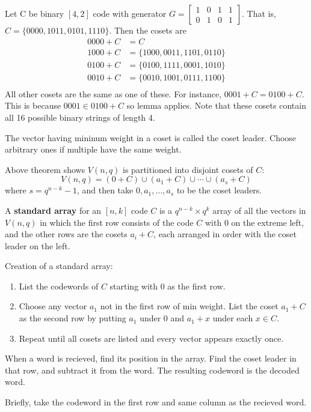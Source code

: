 \documentclass{article}
\begin{document}
\begin{example}
  Let C be binary \( [4, 2] \) code with generator \( G = \begin{bmatrix}
    1 & 0 & 1 & 1 \\
    0 & 1 & 0 & 1
  \end{bmatrix} \). That is, \( C = \{0000, 1011, 0101, 1110\} \). Then the cosets are \begin{align*}
    0000 + C & = C                          \\
    1000 + C & = \{1000, 0011, 1101, 0110\} \\
    0100 + C & = \{0100, 1111, 0001, 1010\} \\
    0010 + C & = \{0010, 1001, 0111, 1100\} \\
  \end{align*}
  All other cosets are the same as one of these. For instance, \( 0001 + C = 0100 + C \). This is because \( 0001 \in 0100 + C \) so lemma applies. Note that these cosets contain all 16 possible binary strings of length 4.
\end{example}
\begin{definition}
  The vector having mininum weight in a coset is called the coset leader. Choose arbitrary ones if multiple have the same weight.

  Above theorem shows \( V(n, q) \) is partitioned into disjoint cosets of \( C \): \[
    V(n, q) = (0 + C) \cup (a_1 + C) \cup \cdots \cup (a_s + C)
  \]
  where \( s = q^{n-k} -1 \), and then take \( 0, a_1, \dots, a_s \) to be the coset leaders.

  A \textbf{standard array} for an \( [n, k] \) code \( C \) is a \( q^{n-k} \times q^k \) array of all the vectors in \( V(n, q) \) in which the first row consists of the code \( C \) with \( 0 \) on the extreme left, and the other rows are the cosets \( a_i + C \), each arranged in order with the coset leader on the left.
\end{definition}
\begin{proposition}
  Creation of a standard array:
  \begin{enumerate}
    \item List the codewords of \( C \) starting with \( 0 \) as the first row.
    \item Choose any vector \( a_1 \) not in the first row of min weight. List the coset \( a_1 + C \) as the second row by putting \( a_1 \) under 0 and \( a_1 + x \) under each \( x \in C \).
    \item Repeat until all cosets are listed and every vector appears exactly once.
  \end{enumerate}
\end{proposition}
\begin{proposition}
  When a word is recieved, find its position in the array. Find the coset leader in that row, and subtract it from the word. The resulting codeword is the decoded word.

  Briefly, take the codeword in the first row and same column as the recieved word.
\end{proposition}
\end{document}
